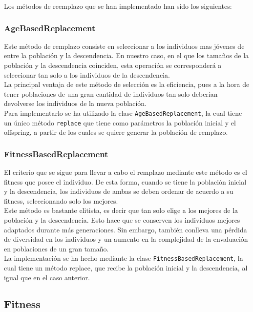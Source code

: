 Los métodos de reemplazo que se han implementado han sido los siguientes:

\subsubsection{AgeBasedReplacement}

Este método de remplazo consiste en seleccionar a los individuos mas jóvenes de entre la población y la descendencia. En nuestro caso, en el que los tamaños de la población y la descendencia coinciden, esta operación se corresponderá a seleccionar tan solo a los individuos de la descendencia. \\

La principal ventaja de este método de selección es la eficiencia, pues a la hora de tener poblaciones de una gran cantidad de individuos tan solo deberían devolverse los individuos de la nueva población. \\

Para implementarlo se ha utilizado la clase \texttt{AgeBasedReplacement}, la cual tiene un único método \texttt{replace} que tiene como parámetros la población inicial y el offspring, a partir de los cuales se quiere generar la población de remplazo.

\subsubsection{FitnessBasedReplacement}

El criterio que se sigue para llevar a cabo el remplazo mediante este método es el fitness que posee el individuo. De esta forma, cuando se tiene la población inicial y la descendencia, los individuos de ambas se deben ordenar de acuerdo a su fitness, seleccionando solo los mejores. \\

Este método es bastante elitista, es decir que tan solo elige a los mejores de la población y la descendencia. Esto hace que se conserven los individuos mejores adaptados durante más generaciones. Sin embargo, también conlleva una pérdida de diversidad en los individuos y un aumento en la complejidad de la envaluación en poblaciones de un gran tamaño. \\

La implementación se ha hecho mediante la clase \texttt{FitnessBasedReplacement}, la cual tiene un método replace, que recibe la población inicial y la descendencia, al igual que en el caso anterior.

\subsection{Fitness}

